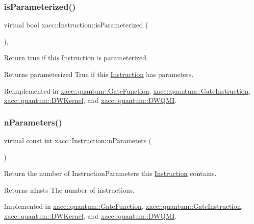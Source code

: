 \subsubsection{\texorpdfstring{is\+Parameterized()}{isParameterized()}}
{\footnotesize\ttfamily virtual bool xacc\+::\+Instruction\+::is\+Parameterized (\begin{DoxyParamCaption}{ }\end{DoxyParamCaption})\hspace{0.3cm}{\ttfamily [inline]}, {\ttfamily [virtual]}}

Return true if this \hyperlink{a01155}{Instruction} is parameterized.

\begin{DoxyReturn}{Returns}
parameterized True if this \hyperlink{a01155}{Instruction} has parameters. 
\end{DoxyReturn}


Reimplemented in \hyperlink{a01011_afad47903e0ed55ddbfa827ef8408a94b}{xacc\+::quantum\+::\+Gate\+Function}, \hyperlink{a01015_afe7aeeb398262931e156bcb3950f8188}{xacc\+::quantum\+::\+Gate\+Instruction}, \hyperlink{a00983_a8957ea368244ed4a4ebd85f6bfecb785}{xacc\+::quantum\+::\+D\+W\+Kernel}, and \hyperlink{a00987_aee43b2e499f122dfe250b529a3f77add}{xacc\+::quantum\+::\+D\+W\+Q\+MI}.

\mbox{\label{a01155_ad54585d13c04ffd20296fff7ab8107ff}} 
\subsubsection{\texorpdfstring{n\+Parameters()}{nParameters()}}
{\footnotesize\ttfamily virtual const int xacc\+::\+Instruction\+::n\+Parameters (\begin{DoxyParamCaption}{ }\end{DoxyParamCaption})\hspace{0.3cm}{\ttfamily [pure virtual]}}

Return the number of Instruction\+Parameters this \hyperlink{a01155}{Instruction} contains.

\begin{DoxyReturn}{Returns}
n\+Insts The number of instructions. 
\end{DoxyReturn}


Implemented in \hyperlink{a01011_ad0bffcbc0884d81d6bdddf55385fc6c9}{xacc\+::quantum\+::\+Gate\+Function}, \hyperlink{a01015_a3752912b2c402668ca4814e21d4bbd26}{xacc\+::quantum\+::\+Gate\+Instruction}, \hyperlink{a00983_a029429948329b94c1d89f32cf5c486d4}{xacc\+::quantum\+::\+D\+W\+Kernel}, and \hyperlink{a00987_afdfc8b852ba29c2b21c5c368098ffc4c}{xacc\+::quantum\+::\+D\+W\+Q\+MI}.

